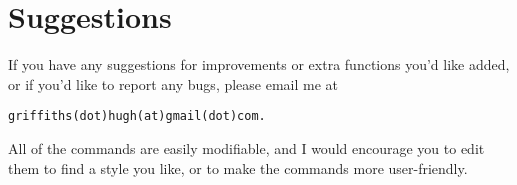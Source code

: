 \documentclass{article}
\begin{document}
\section*{Suggestions}

If you have any suggestions for improvements or extra functions you'd
like added, or if you'd like to report any bugs, please email me at
\begin{verbatim}
griffiths(dot)hugh(at)gmail(dot)com.
\end{verbatim}

All of the commands are easily modifiable, and I would encourage you
to edit them to find a style you like, or to make the commands more
user-friendly.
\end{document}
